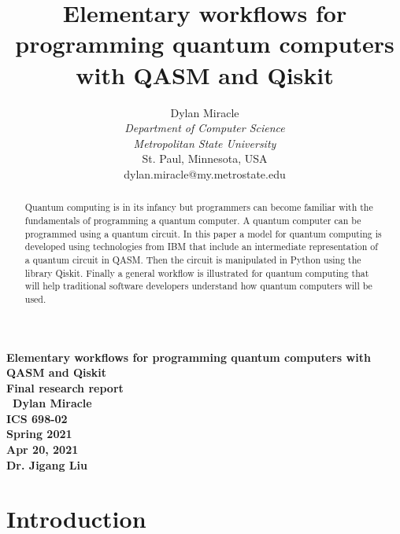 \documentclass{article}
\begin{document}
\begin{titlepage}
    \begin{center}
        \vspace{4cm}
        \large
        \textbf{
            Elementary workflows for programming quantum computers with QASM and Qiskit \\
            Final research report \\\
            Dylan Miracle \\
            ICS 698-02 \\
            Spring 2021 \\
            Apr 20, 2021 \\
            Dr. Jigang Liu
        }
    \end{center}
\end{titlepage}
\title{Elementary workflows for programming quantum computers with QASM and Qiskit}

\author{Dylan Miracle \\
\textit{Department of Computer Science} \\
\textit{Metropolitan State University}\\
St. Paul, Minnesota, USA \\
dylan.miracle@my.metrostate.edu}


\maketitle
\tableofcontents
\pagebreak
\begin{abstract}
Quantum computing is in its infancy but programmers can become familiar with the fundamentals of programming a quantum computer. A quantum computer can be programmed using a quantum circuit. In this paper a model for quantum computing is developed using technologies from IBM that include an intermediate representation of a quantum circuit in QASM. Then the circuit is manipulated in Python using the library Qiskit. Finally a general workflow is illustrated for quantum computing that will help traditional software developers understand how quantum computers will be used. 
\end{abstract}

\section{Introduction}
\end{document}
